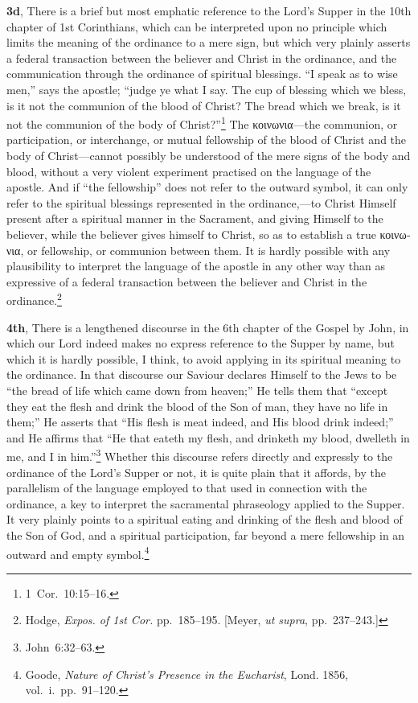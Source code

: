 \documentclass[
]{book}
\begin{document}
\textbf{3d}, There is a brief but most emphatic reference to the Lord's Supper in the 10th chapter of 1st Corinthians, which can be interpreted upon no principle which limits the meaning of the ordinance to a mere sign, but which very plainly asserts a federal transaction between the believer and Christ in the ordinance, and the communication through the ordinance of spiritual blessings. ``I speak as to wise men,'' says the apostle; ``judge ye what I say. The cup of blessing which we bless, is it not the communion of the blood of Christ? The bread which we break, is it not the communion of the body of Christ?''\footnote{1~Cor.~10:15--16.} The \foreignlanguage{greek}{κοινωνια}---the communion, or participation, or interchange, or mutual fellowship of the blood of Christ and the body of Christ---cannot possibly be understood of the mere signs of the body and blood, without a very violent experiment practised on the language of the apostle. And if ``the fellowship'' does not refer to the outward symbol, it can only refer to the spiritual blessings represented in the ordinance,---to Christ Himself present after a spiritual manner in the Sacrament, and giving Himself to the believer, while the believer gives himself to Christ, so as to establish a true \foreignlanguage{greek}{κοινωνια}, or fellowship, or communion between them. It is hardly possible with any plausibility to interpret the language of the apostle in any other way than as expressive of a federal transaction between the believer and Christ in the ordinance.\footnote{Hodge, \emph{Expos. of 1st Cor.} pp.~185--195. {[}Meyer, \emph{ut supra}, pp.~237--243.{]}}

\textbf{4th}, There is a lengthened discourse in the 6th chapter of the Gospel by John, in which our Lord indeed makes no express reference to the Supper by name, but which it is hardly possible, I think, to avoid applying in its spiritual meaning to the ordinance. In that discourse our Saviour declares Himself to the Jews to be ``the bread of life which came down from heaven;'' He tells them that ``except they eat the flesh and drink the blood of the Son of man, they have no life in them;'' He asserts that ``His flesh is meat indeed, and His blood drink indeed;'' and He affirms that ``He that eateth my flesh, and drinketh my blood, dwelleth in me, and I in him.''\footnote{John~6:32--63.} Whether this discourse refers directly and expressly to the ordinance of the Lord's Supper or not, it is quite plain that it affords, by the parallelism of the language employed to that used in connection with the ordinance, a key to interpret the sacramental phraseology applied to the Supper. It very plainly points to a spiritual eating and drinking of the flesh and blood of the Son of God, and a spiritual participation, far beyond a mere fellowship in an outward and empty symbol.\footnote{Goode, \emph{Nature of Christ's Presence in the Eucharist}, Lond. 1856, vol.~i.~pp.~91--120.}
\end{document}
